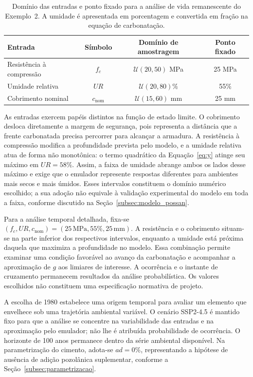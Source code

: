 \begin{table}[htbp]
\centering
\caption{Domínio das entradas e ponto fixado para a análise de vida remanescente do Exemplo~2. A umidade é apresentada em porcentagem e convertida em fração na equação de carbonatação.}
\label{tab:viga_va}
\begin{tabular}{lccc}
\toprule
Entrada & Símbolo & Domínio de amostragem & Ponto fixado \\
\midrule
Resistência à compressão & $f_c$ & $\mathcal{U}(20,50)$ MPa & 25 MPa \\
Umidade relativa & $UR$ & $\mathcal{U}(20,80)$\% & 55\% \\
Cobrimento nominal & $c_{\mathrm{nom}}$ & $\mathcal{U}(15,60)$ mm & 25 mm \\
\bottomrule
\end{tabular}
\end{table}

As entradas exercem papéis distintos na função de estado limite. O cobrimento desloca diretamente a margem de segurança, pois representa a distância que a frente carbonatada precisa percorrer para alcançar a armadura. A resistência à compressão modifica a profundidade prevista pelo modelo, e a umidade relativa atua de forma não monotônica: o termo quadrático da Equação~\eqref{eq:y} atinge seu máximo em $UR=58\%$. Assim, a faixa de umidade abrange ambos os lados desse máximo e exige que o emulador represente respostas diferentes para ambientes mais secos e mais úmidos. Esses intervalos constituem o domínio numérico escolhido; a sua adoção não equivale à validação experimental do modelo em toda a faixa, conforme discutido na Seção~\ref{subsec:modelo_possan}.

Para a análise temporal detalhada, fixa-se $(f_c,UR,c_{\mathrm{nom}})=(25\,\mathrm{MPa},55\%,25\,\mathrm{mm})$. A resistência e o cobrimento situam-se na parte inferior dos respectivos intervalos, enquanto a umidade está próxima daquela que maximiza a profundidade no modelo. Essa combinação permite examinar uma condição favorável ao avanço da carbonatação e acompanhar a aproximação de $g$ aos limiares de interesse. A ocorrência e o instante de cruzamento permanecem resultados da análise probabilística. Os valores escolhidos não constituem uma especificação normativa de projeto.

A escolha de 1980 estabelece uma origem temporal para avaliar um elemento que envelhece sob uma trajetória ambiental variável. O cenário SSP2-4.5 é mantido fixo para que a análise se concentre na variabilidade das entradas e na aproximação pelo emulador; não lhe é atribuída probabilidade de ocorrência. O horizonte de 100 anos permanece dentro da série ambiental disponível. Na parametrização do cimento, adota-se $ad=0\%$, representando a hipótese de ausência de adição pozolânica suplementar, conforme a Seção~\ref{subsec:parametrizacao}.

